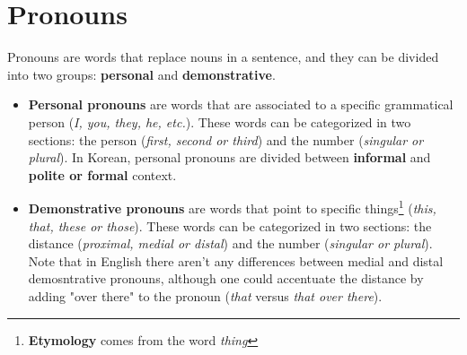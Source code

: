 \section{Pronouns}
Pronouns are words that replace nouns in a sentence, and they can be divided into two groups: \textbf{personal} and \textbf{demonstrative}.

\begin{itemize}
    \item \textbf{Personal pronouns} are words that are associated to a specific grammatical person (\textit{I, you, they, he, etc.}). These words can be categorized in two sections: the person (\textit{first, second or third}) and the number (\textit{singular or plural}). In Korean, personal pronouns are divided between \textbf{informal} and \textbf{polite or formal} context.
    
    \item \textbf{Demonstrative pronouns} are words that point to specific things\footnote{\textbf{Etymology}  comes from the word \textit{thing}} (\textit{this, that, these or those}). These words can be categorized in two sections: the distance (\textit{proximal, medial or distal}) and the number (\textit{singular or plural}). Note that in English there aren't any differences between medial and distal demosntrative pronouns, although one could accentuate the distance by adding "over there" to the pronoun (\textit{that} versus \textit{that over there}).
\end{itemize}



